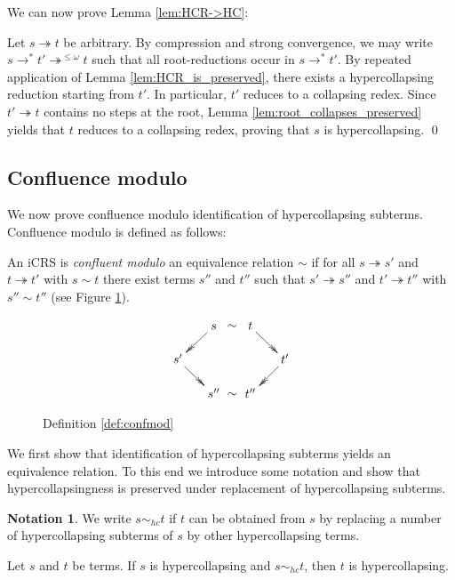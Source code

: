 \documentclass{LMCS}
\theoremstyle{plain}
\theoremstyle{definition}
\newtheorem{notation}[thm]{Notation}
\newcommand{\rewt}{\rightarrow^*}
\newcommand{\trewt}{\twoheadrightarrow}
\newcommand{\trewtp}[1]{\twoheadrightarrow^{#1}}
\newcommand{\simhc}{\sim_{hc}}
\begin{document}
We can now prove Lemma \ref{lem:HCR->HC}:

Let $s \trewt t$ be arbitrary. By compression and strong convergence,
we may write $s \rewt t' \trewtp{\leq \omega} t$ such that all
root-reductions occur in $s \rewt t'$. By repeated application of Lemma
\ref{lem:HCR_is_preserved}, there exists a hypercollapsing reduction
starting from $t'$. In particular, $t'$ reduces to a collapsing redex.
Since $t' \trewt t$ contains no steps at the root, Lemma
\ref{lem:root_collapses_preserved} yields that $t$ reduces to a
collapsing redex, proving that $s$ is hypercollapsing. \qed


\subsection{Confluence modulo}
\label{sec:cm}

We now prove confluence modulo identification of hypercollapsing
subterms. Confluence modulo is defined as follows:
\begin{defi}
\label{def:confmod}
An iCRS is \emph{confluent modulo} an equivalence relation
$\sim$ if for all $s \trewt s'$ and $t \trewt t'$ with $s \sim t$ there
exist terms $s''$ and $t''$ such that $s' \trewt s''$ and
$t' \trewt t''$ with $s'' \sim t''$ (see Figure \ref{fig:confmod}).
\end{defi}

\begin{figure}
\[
\xymatrix@=0.5cm{
 & s \ar@{->>}[dl] \ar@{}[r]|*\txt{$\sim$} & t \ar@{->>}[dr] &    \\
s' \ar@{->>}[dr] & & & t' \ar@{->>}[dl] \\
 & s'' \ar@{}[r]|*\txt{$\sim$} & t'' & \\
}
\]
\caption{\label{fig:confmod}Definition \ref{def:confmod}}
\end{figure}

We first show that identification of hypercollapsing subterms yields an equivalence relation. To this end we introduce some notation and show that hypercollapsingness is preserved under replacement of hypercollapsing subterms.
\begin{notation}
We write $s \simhc t$ if $t$ can be obtained from $s$ by replacing a number of hypercollapsing subterms of $s$ by other hypercollapsing terms.
\end{notation}

\begin{prop}
\label{prop:subreplaceokay}
Let $s$ and $t$ be terms. If $s$ is hypercollapsing and $s \simhc t$, then $t$ is hypercollapsing.
\end{prop}
\end{document}
